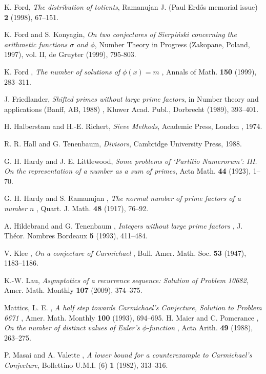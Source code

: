 \documentclass[11pt]{amsart}
\theoremstyle{remark}
\theoremstyle{plain}
\numberwithin{equation}{section}
\renewcommand{\(}{\left(}
\renewcommand{\)}{\right)}
\begin{document}
\begin{thebibliography}{EH38}
 K. Ford, {\it The distribution of totients},
Ramanujan J. (Paul Erd\H os memorial issue) {\bf 2} (1998), 67--151.

 K. Ford and S. Konyagin, {\it  On two conjectures of
Sierpi\'nski concerning the arithmetic functions $\sigma$ and $\phi$},
Number Theory in Progress (Zakopane, Poland, 1997), vol. II, 
de Gruyter (1999), 795-803.

 K. Ford , {\it  The number of solutions of $\phi(x)=m$
},  Annals of Math. {\bf  150 } (1999), 283--311.


 J. Friedlander, {\it  Shifted primes without large prime
factors}, in  Number theory and applications (Banff, AB, 1988)
, Kluwer Acad. Publ., Dorbrecht (1989), 393--401.

 H. Halberstam and H.-E. Richert, {\it Sieve Methods},
Academic Press, London , 1974.

 R. R. Hall and G. Tenenbaum, {\it Divisors}, 
Cambridge University Press, 1988.

 G. H. Hardy and J. E. Littlewood, {\it  Some problems of
`Partitio Numerorum': III.  On the representation of a number as a sum of
primes},  Acta Math. {\bf  44 } (1923), 1--70.


 G. H. Hardy and S. Ramanujan , {\it  The normal number of
prime factors of a number $n$ },  Quart. J. Math. {\bf  48 } (1917), 76--92. 

 A. Hildebrand and G. Tenenbaum , {\it  Integers without
large prime factors },  J. Th\'eor. Nombres Bordeaux {\bf  5 } (1993),
411--484. 

 V. Klee , {\it  On a conjecture of Carmichael
},  Bull. Amer. Math. Soc. {\bf  53 } (1947), 1183--1186. 


 K.-W. Lau, {\it Asymptotics of a recurrence 
sequence: Solution of Problem 10682}, Amer. Math. Monthly {\bf 107}
(2009), 374--375.


 Mattics, L. E. , {\it  A half step towards Carmichael's
Conjecture, Solution to Problem 6671 },  Amer. Math. Monthly {\bf  100
} (1993), 694--695.  H. Maier and C. Pomerance , {\it  On the number of
distinct values of Euler's $\phi$-function },  Acta Arith.
{\bf  49 } (1988), 263--275. 

 P. Masai and A. Valette , {\it  A lower bound for a 
counterexample to Carmichael's Conjecture},  Bollettino U.M.I. (6)
{\bf 1} (1982), 313--316. 


\end{thebibliography}
\end{document}
